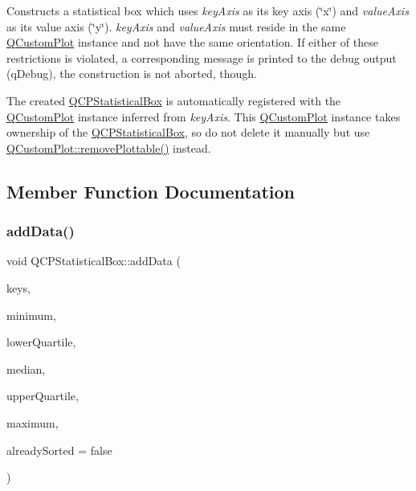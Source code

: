 Constructs a statistical box which uses {\itshape key\+Axis} as its key axis (\char`\"{}x\char`\"{}) and {\itshape value\+Axis} as its value axis (\char`\"{}y\char`\"{}). {\itshape key\+Axis} and {\itshape value\+Axis} must reside in the same \hyperlink{class_q_custom_plot}{Q\+Custom\+Plot} instance and not have the same orientation. If either of these restrictions is violated, a corresponding message is printed to the debug output (q\+Debug), the construction is not aborted, though.

The created \hyperlink{class_q_c_p_statistical_box}{Q\+C\+P\+Statistical\+Box} is automatically registered with the \hyperlink{class_q_custom_plot}{Q\+Custom\+Plot} instance inferred from {\itshape key\+Axis}. This \hyperlink{class_q_custom_plot}{Q\+Custom\+Plot} instance takes ownership of the \hyperlink{class_q_c_p_statistical_box}{Q\+C\+P\+Statistical\+Box}, so do not delete it manually but use \hyperlink{class_q_custom_plot_af3dafd56884208474f311d6226513ab2}{Q\+Custom\+Plot\+::remove\+Plottable()} instead. 

\subsection{Member Function Documentation}
\mbox{\label{class_q_c_p_statistical_box_a9a8739c5b8291db8fd839e892fc8f478}} 
\subsubsection{\texorpdfstring{add\+Data()}{addData()}\hspace{0.1cm}{\footnotesize\ttfamily [1/2]}}
{\footnotesize\ttfamily void Q\+C\+P\+Statistical\+Box\+::add\+Data (\begin{DoxyParamCaption}\item[{const Q\+Vector$<$ double $>$ \&}]{keys,  }\item[{const Q\+Vector$<$ double $>$ \&}]{minimum,  }\item[{const Q\+Vector$<$ double $>$ \&}]{lower\+Quartile,  }\item[{const Q\+Vector$<$ double $>$ \&}]{median,  }\item[{const Q\+Vector$<$ double $>$ \&}]{upper\+Quartile,  }\item[{const Q\+Vector$<$ double $>$ \&}]{maximum,  }\item[{bool}]{already\+Sorted = {\ttfamily false} }\end{DoxyParamCaption})}

